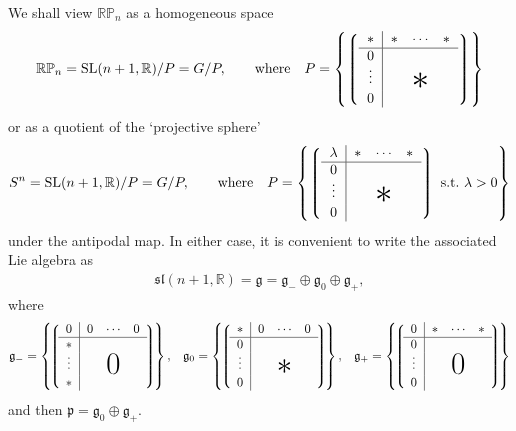 \documentclass[pdftex]{sigma}
\begin{document}
We shall view ${\mathbb{RP}}_n$ as a homogeneous space
\[{\mathbb{RP}}_n={\mathrm{SL}}(n+1,{\mathbb{R}})/P=G/P,\qquad\mbox{where}\quad
P=\left\{
\left\lgroup\begin{tabular}{c|ccc}$\ast$&$\ast$&$\!\cdots\!$&$\ast$\\ \hline
$0$\\
\raisebox{2pt}[15pt]{$\vdots$}&&
\raisebox{-2pt}[0pt][0pt]{\makebox[0pt]{\Huge$\ast$}}\\
$0$\end{tabular}\right\rgroup\right\}\]
or as a quotient of the `projective sphere'
\[S^n={\mathrm{SL}}(n+1,{\mathbb{R}})/P=G/P,\qquad\mbox{where}\quad
P=\left\{
\left\lgroup\begin{tabular}{c|ccc}$\lambda$&$\ast$&$\!\cdots\!$&$\ast$\\ \hline
$0$\\
\raisebox{2pt}[15pt]{$\vdots$}&&
\raisebox{-2pt}[0pt][0pt]{\makebox[0pt]{\Huge$\ast$}}\\
$0$\end{tabular}\right\rgroup\mbox{ s.t.\ }\lambda>0\right\}\]
under the antipodal map. In either case, it is convenient to write the
associated Lie algebra as
\begin{gather}\label{graded}
{\mathfrak{sl}}(n+1,{\mathbb{R}})={\mathfrak{g}}=
{\mathfrak{g}}_-\oplus{\mathfrak{g}}_0\oplus{\mathfrak{g}}_+,
\end{gather}
where{\samepage
\begin{gather*}
{\mathfrak{g}}_-=\left\{\!
\left\lgroup\!\begin{tabular}{c|ccc}$0$&$0$&$\!\cdots\!$&$0$\\ \hline
$\ast$\\
\raisebox{2pt}[15pt]{$\vdots$}&&
\raisebox{-2pt}[0pt][0pt]{\makebox[0pt]{\Huge$0$}}\\
$\ast$\end{tabular}\!\right\rgroup\!\right\},\!\quad
{\mathfrak{g}}_0=\left\{\!
\left\lgroup\!\begin{tabular}{c|ccc}$\ast$&$0$&$\!\cdots\!$&$0$\\ \hline
$0$\\
\raisebox{2pt}[15pt]{$\vdots$}&&
\raisebox{-2pt}[0pt][0pt]{\makebox[0pt]{\Huge$\ast$}}\\
$0$\end{tabular}\!\right\rgroup\!\right\},\!\quad
{\mathfrak{g}}_+=\left\{\!
\left\lgroup\!\begin{tabular}{c|ccc}$0$&$\ast$&$\!\cdots\!$&$\ast$\\ \hline
$0$\\
\raisebox{2pt}[15pt]{$\vdots$}&&
\raisebox{-2pt}[0pt][0pt]{\makebox[0pt]{\Huge$0$}}\\
$0$\end{tabular}\!\right\rgroup\!\right\}
\end{gather*}
and then ${\mathfrak{p}}={\mathfrak{g}}_0\oplus{\mathfrak{g}}_+$.}
\end{document}
